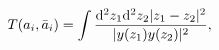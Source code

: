 \begin{equation}
T (a_i, \bar{a}_i)  =  \int { {\rm d}^2 z_1 {\rm d}^2 z_2
 |z_1 - z_2|^2 \over |y(z_1)y(z_2)|^2 },
\label{Eqtwo}
\end{equation}

